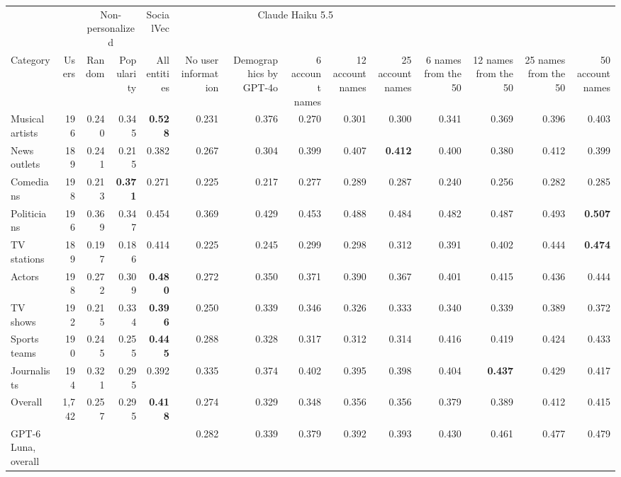 \begin{tabular}{lrrrrrrrrrrrrr}
\toprule
 &  & \multicolumn{2}{c}{Non-personalized} & SocialVec & \multicolumn{5}{c}{Claude Haiku 5.5} \\
Category & Users & Random & Popularity & All entities & No user information & Demographics by GPT-4o & 6 account names & 12 account names & 25 account names & 6 names from the 50 & 12 names from the 50 & 25 names from the 50 & 50 account names \\
\midrule
Musical artists & 196 & 0.240 & 0.345 & \textbf{0.528} & 0.231 & 0.376 & 0.270 & 0.301 & 0.300 & 0.341 & 0.369 & 0.396 & 0.403 \\
News outlets & 189 & 0.241 & 0.215 & 0.382 & 0.267 & 0.304 & 0.399 & 0.407 & \textbf{0.412} & 0.400 & 0.380 & 0.412 & 0.399 \\
Comedians & 198 & 0.213 & \textbf{0.371} & 0.271 & 0.225 & 0.217 & 0.277 & 0.289 & 0.287 & 0.240 & 0.256 & 0.282 & 0.285 \\
Politicians & 196 & 0.369 & 0.347 & 0.454 & 0.369 & 0.429 & 0.453 & 0.488 & 0.484 & 0.482 & 0.487 & 0.493 & \textbf{0.507} \\
TV stations & 189 & 0.197 & 0.186 & 0.414 & 0.225 & 0.245 & 0.299 & 0.298 & 0.312 & 0.391 & 0.402 & 0.444 & \textbf{0.474} \\
Actors & 198 & 0.272 & 0.309 & \textbf{0.480} & 0.272 & 0.350 & 0.371 & 0.390 & 0.367 & 0.401 & 0.415 & 0.436 & 0.444 \\
TV shows & 192 & 0.215 & 0.334 & \textbf{0.396} & 0.250 & 0.339 & 0.346 & 0.326 & 0.333 & 0.340 & 0.339 & 0.389 & 0.372 \\
Sports teams & 190 & 0.245 & 0.255 & \textbf{0.445} & 0.288 & 0.328 & 0.317 & 0.312 & 0.314 & 0.416 & 0.419 & 0.424 & 0.433 \\
Journalists & 194 & 0.321 & 0.295 & 0.392 & 0.335 & 0.374 & 0.402 & 0.395 & 0.398 & 0.404 & \textbf{0.437} & 0.429 & 0.417 \\
\midrule
Overall & 1,742 & 0.257 & 0.295 & \textbf{0.418} & 0.274 & 0.329 & 0.348 & 0.356 & 0.356 & 0.379 & 0.389 & 0.412 & 0.415 \\
GPT-6 Luna, overall &  &  &  &  & 0.282 & 0.339 & 0.379 & 0.392 & 0.393 & 0.430 & 0.461 & 0.477 & 0.479 \\
\bottomrule
\end{tabular}
